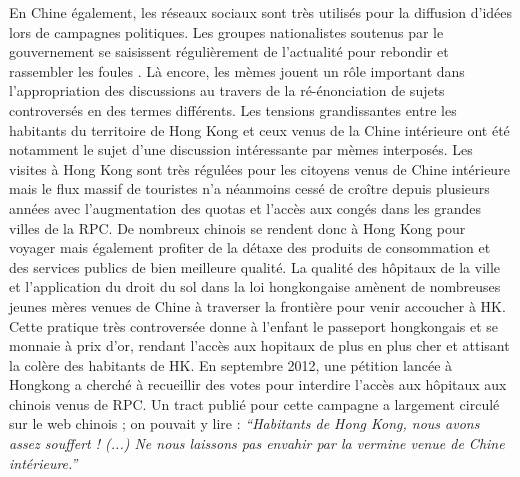\begin{description}
En Chine \'egalement, les r\'eseaux sociaux sont tr\`es utilis\'es pour la diffusion d{\textquoteright}id\'ees lors de campagnes politiques. Les groupes nationalistes soutenus par le gouvernement se saisissent r\'eguli\`erement de l{\textquoteright}actualit\'e pour rebondir et rassembler les foules \cite{Wu2007}. L\`a encore, les m\`emes jouent un r\^ole important dans l{\textquoteright}appropriation des discussions au travers de la r\'e-\'enonciation de sujets controvers\'es en des termes diff\'erents. Les tensions grandissantes entre les habitants du territoire de Hong Kong et ceux venus de la Chine int\'erieure ont \'et\'e notamment le sujet d{\textquoteright}une discussion int\'eressante par m\`emes interpos\'es. Les visites \`a Hong Kong sont tr\`es r\'egul\'ees pour les citoyens venus de Chine int\'erieure mais le flux massif de touristes n{\textquoteright}a n\'eanmoins cess\'e de cro\^itre depuis plusieurs ann\'ees avec l{\textquoteright}augmentation des quotas et l{\textquoteright}acc\`es aux cong\'es dans les grandes villes de la RPC. De nombreux chinois se rendent donc \`a Hong Kong pour voyager mais \'egalement profiter de la d\'etaxe des produits de consommation et des services publics de bien meilleure qualit\'e. La qualit\'e des h\^opitaux de la ville et l{\textquoteright}application du droit du sol dans la loi hongkongaise am\`enent de nombreuses jeunes m\`eres venues de Chine \`a traverser la fronti\`ere pour venir accoucher \`a HK. Cette pratique tr\`es controvers\'ee donne \`a l{\textquoteright}enfant le passeport hongkongais et se monnaie \`a prix d{\textquoteright}or, rendant l{\textquoteright}acc\`es aux hopitaux de plus en plus cher et attisant la col\`ere des habitants de HK. En septembre 2012, une p\'etition lanc\'ee \`a Hongkong a cherch\'e \`a recueillir des votes pour interdire l{\textquoteright}acc\`es aux h\^opitaux aux chinois venus de RPC. Un tract publi\'e pour cette campagne a largement circul\'e sur le web chinois ; on pouvait y lire :\textit{ {\textquotedblleft}Habitants de Hong Kong, nous avons assez souffert ! (...) Ne nous laissons pas envahir par la vermine venue de Chine int\'erieure.{\textquotedblright}}  


\end{description}
